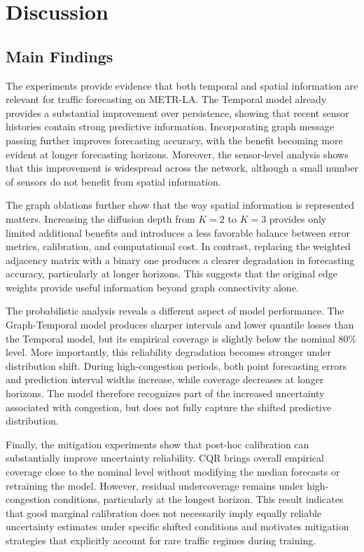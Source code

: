 \section{Discussion}
\label{sec:discussion}

\subsection{Main Findings}
\label{subsec:main_findings}

The experiments provide evidence that both temporal and spatial information
are relevant for traffic forecasting on METR-LA. The Temporal model already
provides a substantial improvement over persistence, showing that recent
sensor histories contain strong predictive information. Incorporating graph
message passing further improves forecasting accuracy, with the benefit
becoming more evident at longer forecasting horizons. Moreover, the
sensor-level analysis shows that this improvement is widespread across the
network, although a small number of sensors do not benefit from spatial
information.

The graph ablations further show that the way spatial information is
represented matters. Increasing the diffusion depth from $K=2$ to $K=3$
provides only limited additional benefits and introduces a less favorable
balance between error metrics, calibration, and computational cost. In
contrast, replacing the weighted adjacency matrix with a binary one produces
a clearer degradation in forecasting accuracy, particularly at longer
horizons. This suggests that the original edge weights provide useful
information beyond graph connectivity alone.

The probabilistic analysis reveals a different aspect of model performance.
The Graph-Temporal model produces sharper intervals and lower quantile losses
than the Temporal model, but its empirical coverage is slightly below the
nominal 80\% level. More importantly, this reliability degradation becomes
stronger under distribution shift. During high-congestion periods, both point
forecasting errors and prediction interval widths increase, while coverage
decreases at longer horizons. The model therefore recognizes part of the
increased uncertainty associated with congestion, but does not fully capture
the shifted predictive distribution.

Finally, the mitigation experiments show that post-hoc calibration can
substantially improve uncertainty reliability. CQR brings overall empirical
coverage close to the nominal level without modifying the median forecasts or
retraining the model. However, residual undercoverage remains under
high-congestion conditions, particularly at the longest horizon. This result
indicates that good marginal calibration does not necessarily imply equally
reliable uncertainty estimates under specific shifted conditions and
motivates mitigation strategies that explicitly account for rare traffic
regimes during training.



